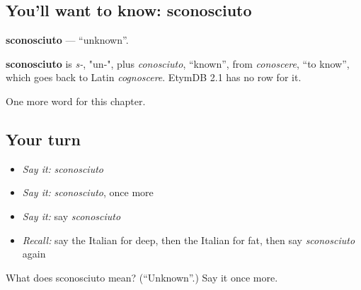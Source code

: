 \subsection*{You'll want to know: sconosciuto}
\textbf{sconosciuto} — \textquotedblleft{}unknown\textquotedblright{}.

\begin{cousinweb}
\textbf{sconosciuto} is \emph{s-}, "un-", plus \emph{conosciuto}, \textquotedblleft{}known\textquotedblright{}, from \emph{conoscere}, \textquotedblleft{}to know\textquotedblright{}, which goes back to Latin \emph{cognoscere}. EtymDB 2.1 has no row for it.
\end{cousinweb}

\begin{grammarlens}[title={What you've built}]
One more word for this chapter.
\end{grammarlens}

\subsection*{Your turn}
\begin{itemize}
\raggedright
  \item \emph{Say it:} \emph{sconosciuto}
  \item \emph{Say it:} \emph{sconosciuto}, once more
  \item \emph{Say it:} say \emph{sconosciuto}
  \item \emph{Recall:} say the Italian for deep, then the Italian for fat, then say \emph{sconosciuto} again
\end{itemize}

\begin{tcolorbox}[breakable,colback=teal!4,colframe=teal!35!black,title={Before you move on}]
What does sconosciuto mean? (\textquotedblleft{}Unknown\textquotedblright{}.) Say it once more.
\end{tcolorbox}
